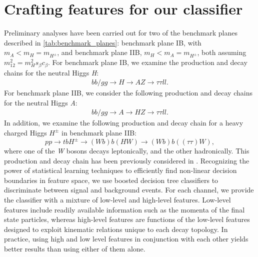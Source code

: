 {\section{Crafting features for our classifier}\label{sec:analysis_details}
Preliminary analyses have been carried out for two of the benchmark planes described in \autoref{tab:benchmark_planes}: benchmark plane IB, with $m_A < m_H = m_{H^\pm}$, and benchmark plane IIB, $m_H < m_A = m_{H^\pm}$, both assuming $m_{12}^2 = m_H^2s_\beta c_\beta$. For benchmark plane IB, we examine the production and decay chains for the neutral Higgs \emph{H}:
\begin{align*}
  bb/gg\rightarrow H\rightarrow AZ\rightarrow \tau\tau ll.
\end{align*}
For benchmark plane IIB, we consider the following production and decay chains for the neutral Higgs \emph{A}:
\begin{align*}
  bb/gg\rightarrow A\rightarrow HZ\rightarrow \tau\tau ll.
\end{align*}
In addition, we examine the following production and decay chain for a heavy charged Higgs $H^\pm$ in benchmark plane IIB:
\[pp\rightarrow tbH^\pm\rightarrow (Wb)b(HW)\rightarrow (Wb)b((\tau\tau)W),\]
where one of the \emph{W} bosons decays leptonically, and the other hadronically. This production and decay chain has been previously considered in \cite{Coleppa2014a}.
Recognizing the power of statistical learning techniques to efficiently find non-linear decision boundaries in feature space, we use boosted decision tree classifiers to discriminate between signal and background events. For each channel, we provide the classifier with a mixture of low-level and high-level features. Low-level features include readily available information such as the momenta of the final state particles, whereas high-level features are functions of the low-level features designed to exploit kinematic relations unique to each decay topology. In practice, using high and low level features in conjunction with each other yields better results than using either of them alone.

}
